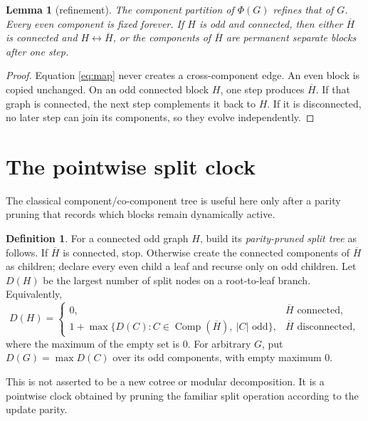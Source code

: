 \documentclass[10pt,a4paper]{amsart}
\newtheorem{lemma}[theorem]{Lemma}
\theoremstyle{definition}
\newtheorem{definition}[theorem]{Definition}
\theoremstyle{remark}
\newcommand{\Comp}{\operatorname{Comp}}
\begin{document}
\begin{lemma}[refinement]\label{lem:refinement}
The component partition of \(\Phi(G)\) refines that of \(G\). Every even
component is fixed forever. If \(H\) is odd and connected, then either
\(\overline H\) is connected and \(H\leftrightarrow\overline H\), or the
components of \(\overline H\) are permanent separate blocks after one step.
\end{lemma}

\begin{proof}
Equation \eqref{eq:map} never creates a cross-component edge. An even block
is copied unchanged. On an odd connected block \(H\), one step produces
\(\overline H\). If that graph is connected, the next step complements it
back to \(H\). If it is disconnected, no later step can join its components,
so they evolve independently.
\end{proof}

\section{The pointwise split clock}

The classical component/co-component tree is useful here only after a
parity pruning that records which blocks remain dynamically active.

\begin{definition}\label{def:tree}
For a connected odd graph \(H\), build its \emph{parity-pruned split tree} as
follows. If \(\overline H\) is connected, stop. Otherwise create the
connected components of \(\overline H\) as children; declare every even child
a leaf and recurse only on odd children. Let \(D(H)\) be the largest number
of split nodes on a root-to-leaf branch. Equivalently,
\begin{equation}
D(H)=
\begin{cases}
0,&\overline H\text{ connected},\\
1+\max\{D(C):C\in\Comp(\overline H),\ |C|\text{ odd}\},
   &\overline H\text{ disconnected},
\end{cases}                                               \label{eq:D}
\end{equation}
where the maximum of the empty set is \(0\). For arbitrary \(G\), put
\(D(G)=\max D(C)\) over its odd components, with empty maximum \(0\).
\end{definition}

This is not asserted to be a new cotree or modular decomposition. It is a
pointwise clock obtained by pruning the familiar split operation according
to the update parity.
\end{document}
